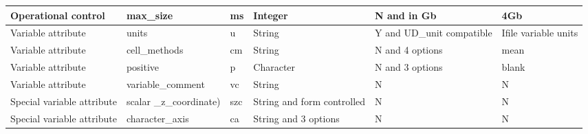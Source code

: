 \begin{tabular}{|p{3cm}|p{2.5cm}|p{1cm}|p{2cm}|p{3cm}|p{2cm}|}
\hline 
Operational control & max\_size & ms & Integer & N and in Gb & 4Gb \\
\hline 
\hline 
Variable attribute & units & u & String & Y and UD\_unit compatible & Ifile variable units \\ 
\hline 
Variable attribute & cell\_methods & cm & String & N and 4 options & mean \\ 
\hline 
Variable attribute & positive & p & Character & N and 3 options & blank \\ 
\hline 
Variable attribute & variable\_comment & vc & String & N & N \\ 
\hline 
\hline 
Special
variable attribute & scalar
\_z\_coordinate) & szc & String and form controlled & N & N \\ 
\hline 
Special
 variable attribute & character\_axis & ca & String and 3 options & N & N \\ 
\hline 
\end{tabular} 

